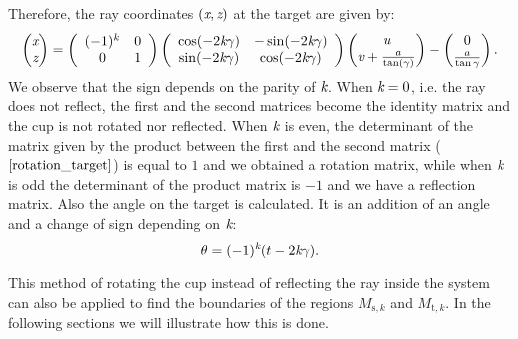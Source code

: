 Therefore, the ray coordinates $(\textit{x},\textit{z})$ at the target are given by:
\begin{equation} \label{rotation_target}\begin{pmatrix} \textit{x}\\ \textit{z}
\end{pmatrix} = \left(\begin{array}{cc}(-1)^k & 0  \\ 0 & 1\end{array}\right)
\left(\begin{array}{cc}\cos(-2\textit{k}\gamma) & -\sin(-2\textit{k}\gamma) \\\sin(-2\textit{k}\gamma) & \cos(-2\textit{k}\gamma)\end{array}\right)\begin{pmatrix} \textit{u} \\
 \textit{v}+\frac{a}{\tan(\gamma)}\end{pmatrix}-\begin{pmatrix}0 \\ \frac{a}{\tan\gamma}\end{pmatrix}.
\end{equation} We observe that the sign depends on the parity of $\textit{k}$. When $\textit{k}=0$, i.e. the ray does not reflect, the first and the second matrices become the identity matrix and the cup is not rotated nor reflected. When $\textit{k}$ is even, the determinant of the matrix given by the product between the first and the second matrix ($\ref{rotation_target}$) is equal to $1$ and we obtained a rotation matrix, while when $\textit{k}$ is odd the determinant of the product matrix is $-1$ and we have a reflection matrix.
Also the angle on the target is calculated. It is an addition of an angle and a change of sign depending on $\textit{k}$:
\begin{equation}\label{teta}
\theta=(-1)^{\textit{k}}(t-2\textit{k}\gamma).
\end{equation}






This method of rotating the cup instead of reflecting the ray inside the system can also be applied to find the boundaries of the regions
$M_{\textrm{s},k}$ and $M_{\textrm{t},k}$. In the following sections we will illustrate how this is done.
\\




